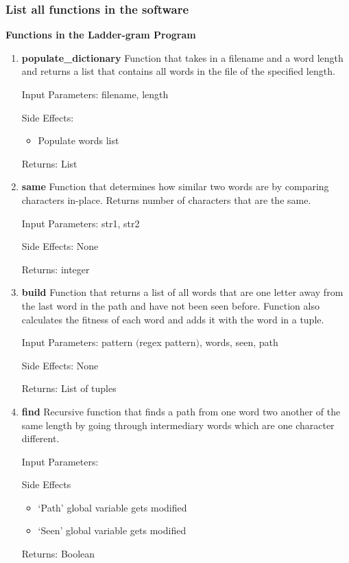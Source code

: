 \documentclass[12pt, a4]{report}
\begin{document}
	\subsubsection{List all functions in the software}
	\textbf{	Functions in the Ladder-gram Program}
	\begin{enumerate}
		\item
			\textbf{populate\_dictionary}
			\textbar{}  Function that takes in a filename and a word length and returns a list that contains all words in the file of the specified length.
			\par Input Parameters: filename, length
			\par Side Effects:
			\begin{itemize}
				\item Populate words list
			\end{itemize}
			\par Returns: List
		\item
			\textbf{same}
			\textbar{}  Function that determines how similar two words are by comparing characters in-place. Returns number of characters that are the same.
			\par Input Parameters: str1, str2
			\par Side Effects: None
			\par Returns: integer
		\item
			\textbf{build}
			\textbar{}  Function that returns a list of all words that are one letter away from the last word in the path and have not been seen before.
			    Function also calculates the fitness of each word and adds it with the word in a tuple.
			\par Input Parameters: pattern $($regex pattern$)$, words, seen, path
			\par Side Effects: None
			\par Returns: List of tuples
		\item
			\textbf{find}
			\textbar{}  Recursive function that finds a path from one word two another of the same length by going through intermediary words which are one character different.
			\par Input Parameters:
			\par Side Effects
			\begin{itemize}
				\item `Path' global variable gets modified 
				\item `Seen' global variable gets modified
			\end{itemize}
			\par Returns: Boolean
	\end{enumerate}
	
\end{document}
